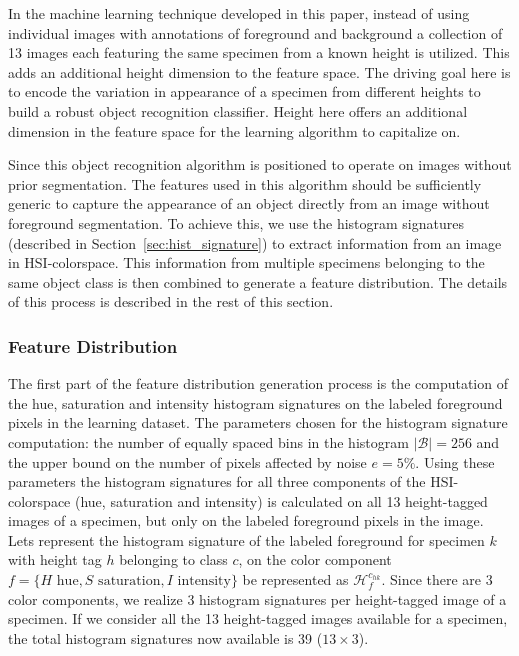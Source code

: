 \documentclass {udthesis}
\begin{document}
In the machine learning technique developed in this paper, instead of using individual images with annotations of foreground and background a collection of 13 images each featuring the same specimen from a known height is utilized. This adds an additional height dimension to the feature space. The driving goal here is to encode the variation in appearance of a specimen from different heights to build a robust object recognition classifier. Height here offers an additional dimension in the feature space for the learning algorithm to capitalize on.

Since this object recognition algorithm is positioned to operate on images without prior segmentation. The features used in this algorithm should be sufficiently generic to capture the appearance of an object directly from an image without foreground segmentation. To achieve this, we use the histogram signatures (described in Section~\ref{sec:hist_signature}) to extract information from an image in HSI-colorspace. This information from multiple specimens belonging to the same object class is then combined to generate a feature distribution. The details of this process is described in the rest of this section.

\subsubsection{Feature Distribution}
\label{sec:distdes_feature_distr}

The first part of the feature distribution generation process is the computation of the hue, saturation and intensity histogram signatures on the labeled foreground pixels in the learning dataset. The parameters chosen for the histogram signature computation: the number of equally spaced bins in the histogram $|\mathcal{B}|=256$ and the upper bound on the number of pixels affected by noise $e=5\%$. Using these parameters the histogram signatures for all three components of the HSI-colorspace (hue, saturation and intensity) is calculated on all 13 height-tagged images of a specimen, but only on the labeled foreground pixels in the image. Lets represent the histogram signature of the labeled foreground for specimen $k$ with height tag $h$ belonging to class $c$, on the color component $f=\{H \text{ hue}, S \text{ saturation}, I \text{ intensity}\}$ be represented as $\mathcal{H}^{c_{hk}}_f$. Since there are 3 color components, we realize 3 histogram signatures per height-tagged image of a specimen. If we 
consider all the 13 height-tagged images available for a specimen, the total histogram signatures now available is 39 ($13 \times 3$).
\end{document}
